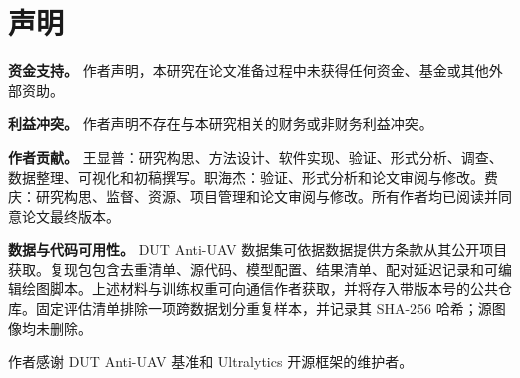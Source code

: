 \section*{声明}

\noindent\textbf{资金支持。} 作者声明，本研究在论文准备过程中未获得任何资金、基金或其他外部资助。

\noindent\textbf{利益冲突。} 作者声明不存在与本研究相关的财务或非财务利益冲突。

\noindent\textbf{作者贡献。} 王显普：研究构思、方法设计、软件实现、验证、形式分析、调查、数据整理、可视化和初稿撰写。职海杰：验证、形式分析和论文审阅与修改。费庆：研究构思、监督、资源、项目管理和论文审阅与修改。所有作者均已阅读并同意论文最终版本。

\noindent\textbf{数据与代码可用性。} DUT Anti-UAV 数据集可依据数据提供方条款从其公开项目获取。复现包包含去重清单、源代码、模型配置、结果清单、配对延迟记录和可编辑绘图脚本。上述材料与训练权重可向通信作者获取，并将存入带版本号的公共仓库。固定评估清单排除一项跨数据划分重复样本，并记录其 SHA-256 哈希；源图像均未删除。

\begin{acknowledgements}
作者感谢 DUT Anti-UAV 基准和 Ultralytics 开源框架的维护者。
\end{acknowledgements}
